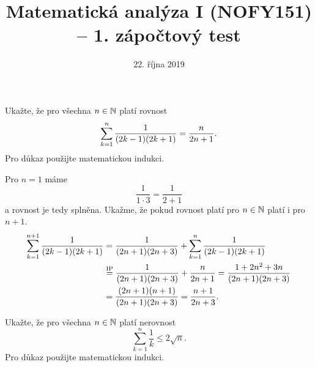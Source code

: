 \documentclass[answers]{exam}
\title{\vspace{-3ex}Matematická analýza I (NOFY151) – 1. zápočtový test\vspace{-1ex}}
\author{\vspace{-2ex}}
\date{\vspace{-2ex}22. října 2019}
\begin{document}
\maketitle

\begin{questions}
  \question[2] Ukažte, že pro všechna $n \in \mathbb{N}$ platí rovnost
  \begin{equation*}
    \sum_{k=1}^{n} \frac{1}{\parens{2k - 1} \parens{2k + 1}}
    =
    \frac{n}{2n + 1}.
  \end{equation*}
  Pro důkaz použijte matematickou indukci.
  
  \begin{solution}
    Pro $n = 1$ máme
    \begin{equation*}
      \frac{1}{1 \cdot 3} = \frac{1}{2 + 1}
    \end{equation*}
    a rovnost je tedy splněna. Ukažme, že pokud rovnost platí pro $n \in \mathbb{N}$ platí i pro $n + 1$. 
    \begin{align*}
      \sum_{k=1}^{n + 1} \frac{1}{\parens{2k - 1} \parens{2k + 1}}
      &=
      \frac{1}{\parens{2n + 1} \parens{2n + 3}} 
      + 
      \sum_{k=1}^{n} \frac{1}{\parens{2k - 1} \parens{2k + 1}}
      \\
      &\texteq{IP}
      \frac{1}{\parens{2n + 1} \parens{2n + 3}} 
      +
      \frac{n}{2n + 1}
      =
      \frac{1 + 2n^2 + 3 n}{\parens{2n + 1} \parens{2n + 3}}
      \\
      &=
      \frac{\parens{2n + 1} \parens{n + 1}}{\parens{2n + 1} \parens{2n + 3}}
      =
      \frac{n + 1}{2n + 3}.
    \end{align*}
  \end{solution}
  
  \question[2] Ukažte, že pro všechna $n \in \mathbb{N}$ platí nerovnost
  \begin{equation*}
    \sum_{k=1}^{n} \frac{1}{k}
    \le
    2 \sqrt{n}.
  \end{equation*}
  Pro důkaz použijte matematickou indukci.
  

\end{questions}
\end{document}
